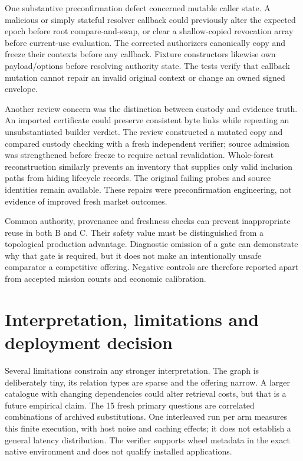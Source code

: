 \documentclass[11pt,a4paper]{article}
\begin{document}
One substantive preconfirmation defect concerned mutable caller state. A malicious or simply stateful resolver callback could previously alter the expected epoch before root compare-and-swap, or clear a shallow-copied revocation array before current-use evaluation. The corrected authorizers canonically copy and freeze their contexts before any callback. Fixture constructors likewise own payload/options before resolving authority state. The tests verify that callback mutation cannot repair an invalid original context or change an owned signed envelope.

Another review concern was the distinction between custody and evidence truth. An imported certificate could preserve consistent byte links while repeating an unsubstantiated builder verdict. The review constructed a mutated copy and compared custody checking with a fresh independent verifier; source admission was strengthened before freeze to require actual revalidation. Whole-forest reconstruction similarly prevents an inventory that supplies only valid inclusion paths from hiding lifecycle records. The original failing probes and source identities remain available. These repairs were preconfirmation engineering, not evidence of improved fresh market outcomes.

Common authority, provenance and freshness checks can prevent inappropriate reuse in both B and C. Their safety value must be distinguished from a topological production advantage. Diagnostic omission of a gate can demonstrate why that gate is required, but it does not make an intentionally unsafe comparator a competitive offering. Negative controls are therefore reported apart from accepted mission counts and economic calibration.

\section{Interpretation, limitations and deployment decision}
\label{sec:limits}


Several limitations constrain any stronger interpretation. The graph is deliberately tiny, its relation types are sparse and the offering narrow. A larger catalogue with changing dependencies could alter retrieval costs, but that is a future empirical claim. The 15 fresh primary questions are correlated combinations of archived substitutions. One interleaved run per arm measures this finite execution, with host noise and caching effects; it does not establish a general latency distribution. The verifier supports wheel metadata in the exact native environment and does not qualify installed applications.
\end{document}
